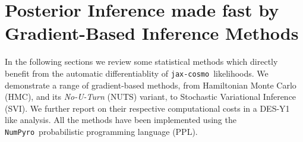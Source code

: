\documentclass[twocolumn,twocolappendix,nofootinbib,iop]{openjournal}
\newcommand{\numpyro}{\texttt{NumPyro}}
\newcommand{\jaxcosmo}{\texttt{jax-cosmo}}
\begin{document}
%
\section{Posterior Inference made fast by Gradient-Based Inference Methods}
\label{sec:chmc}
%
In the following sections we review some statistical methods which directly benefit from the automatic differentiablity of \jaxcosmo\ likelihoods. We demonstrate a range of gradient-based methods, from Hamiltonian Monte Carlo (HMC), and its \textit{No-U-Turn} (NUTS) variant, to Stochastic Variational Inference (SVI). We further report on their respective computational costs in a DES-Y1 like analysis. All  the methods have been implemented using the \numpyro\ probabilistic programming language (PPL). 
%
%
%
\end{document}
